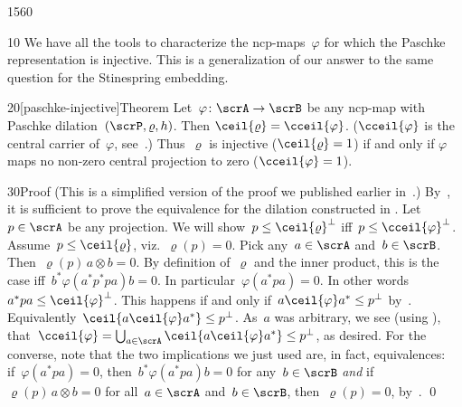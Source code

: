 \begin{parsec}{1560}%
\begin{point}{10}%
We have all the tools to characterize
    the ncp-maps~$\varphi$
    for which the Paschke representation is injective.
This is a generalization of our answer\cite{stineinj}
    to the same question for the Stinespring embedding.
\end{point}
\begin{point}{20}[paschke-injective]{Theorem}%
Let~$\varphi\colon \scrA \to \scrB$ be any ncp-map
    with Paschke dilation~$(\scrP, \varrho, h)$.
Then $\ceil{\varrho} = \cceil{\varphi}$.
($\cceil{\varphi}$ is the central carrier of~$\varphi$, see~.)
Thus~$\varrho$ is injective ($\ceil{\varrho}=1$) if and only if $\varphi$
maps no non-zero central projection to zero ($\cceil{\varphi}=1$).
\begin{point}{30}{Proof}%
(This is a simplified version of the proof we published earlier
    in~\cite[thm.~30]{paschke}.)
By~,
    it is sufficient to prove the equivalence
    for the dilation constructed in .
Let~$p \in \scrA$ be any projection.
We will show~$p \leq \ceil{\varrho}^\perp$ iff~$p \leq \cceil{\varphi}^\perp$.
Assume~$p \leq \ceil{\varrho}$,
    viz.~$\varrho(p) = 0$.
Pick any~$a \in \scrA$ and~$b\in \scrB$.
Then~$\varrho(p)\, a\otimes b = 0$.
By definition of~$\varrho$ and the inner product,
    this is the case iff~$b^* \varphi(a^*p^* pa) b = 0$.
In particular~$\varphi(a^* p a) = 0$.
In other words~$a^* p a \leq \ceil{\varphi}^\perp$.
This happens if and only if~$a \ceil{\varphi} a^* \leq p^\perp$
    by~.
Equivalently~$\ceil{a \ceil{\varphi} a^*} \leq p^\perp$.
As~$a$ was arbitrary,
    we see (using ),
    that~$\cceil{\varphi} = \bigcup_{a \in \scrA} \ceil{a \ceil{\varphi} a^*}
            \leq p^\perp$, as desired.
For the converse, note that
    the two implications we just used are, in fact, equivalences:
        if~$\varphi(a^* p a) =0$,
        then~$b^*\varphi(a^* pa) b = 0$ for any~$b \in \scrB$
        \emph{and} if~$\varrho(p)\, a \otimes b = 0$
        for all~$a \in \scrA$ and~$b\in \scrB$,
        then~$\varrho(p) = 0$, by~.
\qed
\end{point}
\end{point}
\end{parsec}

